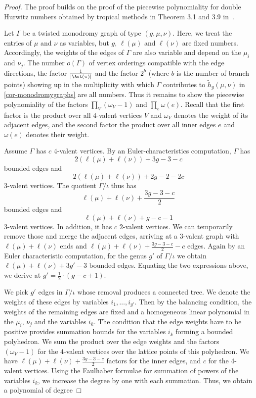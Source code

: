 \begin{proof}
The proof builds on the proof of the piecewise polynomiality for double Hurwitz numbers obtained by tropical methods in Theorem 3.1 and 3.9 in~\cite{CJM11}.

Let $\Gamma$ be a twisted monodromy graph of type $(g,\mu,\nu)$. Here, we treat the entries of $\mu$ and $\nu$ as variables, but $g$, $\ell(\mu)$ and $\ell(\nu)$ are fixed numbers. Accordingly, the weights of the edges of $\Gamma$ are also variable and depend on the $\mu_i$ and $\nu_j$. The number $o(\Gamma)$ of vertex orderings compatible with the edge directions, the factor $\frac{1}{|\Aut(\pi)|}$ and the factor $2^{b}$ (where $b$ is the number of branch points) showing up in the multiplicity with which $\Gamma$ contributes to $\tilde{h}_g(\mu,\nu)$ in \cref{cor-monodromygraphs} are all numbers. Thus it remains to show the piecewise polynomiality of the factors $\prod_V (\omega_V-1)$ and $\prod_e\omega(e)$. Recall that the first factor is the product over all $4$-valent vertices $V$ and $\omega_V$ denotes the weight of its adjacent edges, and the second factor the product over all inner edges $e$ and $\omega(e)$ denotes their weight.

Assume $\Gamma$ has $c$ $4$-valent vertices. By an Euler-characteristics computation, $\Gamma$ has $$2(\ell(\mu)+\ell(\nu))+3g-3-c$$ bounded edges and $$ 2(\ell(\mu)+\ell(\nu))+2g-2-2c$$ $3$-valent vertices. The quotient $\Gamma/\iota$ thus has $$\ell(\mu)+\ell(\nu)+\frac{3g-3-c}{2}$$ bounded edges and $$\ell(\mu)+\ell(\nu)+g-c-1$$ $3$-valent vertices. In addition, it has $c$ $2$-valent vertices. We can temporarily remove those and merge the adjacent edges, arriving at a $3$-valent graph with $\ell(\mu)+\ell(\nu)$ ends and $\ell(\mu)+\ell(\nu)+\frac{3g-3-c}{2}-c$ edges. Again by an Euler characteristic computation, for the genus $g'$ of $\Gamma/\iota$ we obtain
$\ell(\mu)+\ell(\nu)+3g'-3$ bounded edges. Equating the two expressions above, we derive at $g'=\frac{1}{2}\cdot (g-c+1)$.

We pick  $g'$ edges in $\Gamma/\iota$ whose removal produces a connected tree. We denote the weights of these edges by variables $i_1,\ldots,i_{g'}$. Then by the balancing condition, the weights of the remaining edges are fixed and a homogeneous linear polynomial in the $\mu_i$, $\nu_j$ and the variables $i_k$. The condition that the edge weights have to be positive provides summation bounds for the variables $i_k$ forming a bounded polyhedron. We sum the product over the edge weights and the factors $(\omega_V-1)$ for the $4$-valent vertices over the lattice points of this polyhedron. We have $\ell(\mu)+\ell(\nu)+\frac{3g-3-c}{2}$ factors for the inner edges, and $c$ for the $4$-valent vertices. Using the Faulhaber formulae for summation of powers of the variables $i_k$, we increase the degree by one with each summation.
Thus, we obtain a polynomial of degree 


\end{proof}
